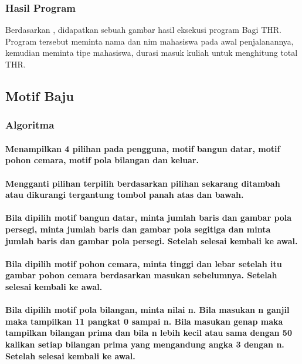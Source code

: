\documentclass[../main.tex]{subfiles}
\begin{document}
    \subsubsection{Hasil Program}
    \begin{indentlevel0}
        \ilz{}Berdasarkan , didapatkan sebuah gambar hasil eksekusi program Bagi THR. Program tersebut meminta nama dan nim mahasiswa pada awal penjalanannya, kemudian meminta tipe mahasiswa, durasi masuk kuliah untuk menghitung total THR.
    \end{indentlevel0}

    \subsection{Motif Baju}
    \subsubsection{Algoritma}
    \paragraph{Menampilkan 4 pilihan pada pengguna, motif bangun datar, motif pohon cemara, motif pola bilangan dan keluar.}
    \paragraph{Mengganti pilihan terpilih berdasarkan pilihan sekarang ditambah atau dikurangi tergantung tombol panah atas dan bawah.}
    \paragraph{Bila dipilih motif bangun datar, minta jumlah baris dan gambar pola persegi, minta jumlah baris dan gambar pola segitiga dan minta jumlah baris dan gambar pola persegi. Setelah selesai kembali ke awal.}
    \paragraph{Bila dipilih motif pohon cemara, minta tinggi dan lebar setelah itu gambar pohon cemara berdasarkan masukan sebelumnya. Setelah selesai kembali ke awal.}
    \paragraph{Bila dipilih motif pola bilangan, minta nilai n. Bila masukan n ganjil maka tampilkan 11 pangkat 0 sampai n. Bila masukan genap maka tampilkan bilangan prima dan bila n lebih kecil atau sama dengan 50 kalikan setiap bilangan prima yang mengandung angka 3 dengan n. Setelah selesai kembali ke awal.}
\end{document}

